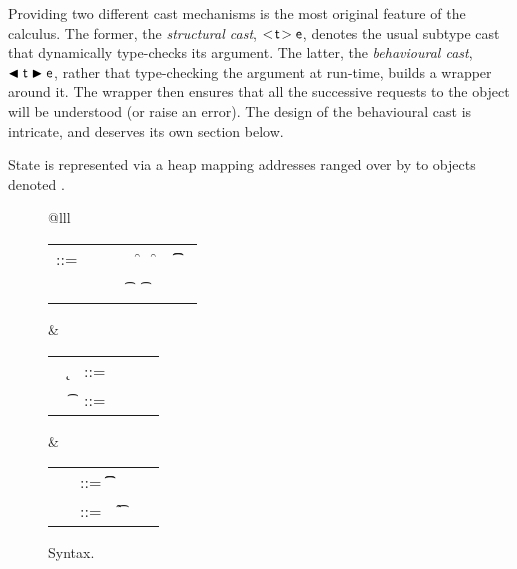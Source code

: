 \documentclass[acmlarge, anonymous, authordraft]{acmart}
\begin{document}
Providing two different cast mechanisms is the most original feature of the
calculus.  The former, the \emph{structural cast}, \(\SubCast\t\e\), denotes
the usual subtype cast that dynamically type-checks its argument.  The
latter, the \emph{behavioural cast}, \(\BehCast\t\e\), rather that
type-checking the argument at run-time, builds a wrapper around it.  The
wrapper then ensures that all the successive requests to the object will be
understood (or raise an error). The design of the behavioural cast is
intricate, and deserves its own section below.

State is represented via a heap \s mapping addresses ranged over by \a
to objects denoted \hspace{-1mm}\obj\C{\b\a}.

\begin{figure}[!h]
\hrulefill

\vspace{4mm}

\small
\begin{tabular}{@{}lll}

\begin{minipage}{9cm}\begin{tabular}{@{}l@{~}l@{}l@{}l@{}l@{}l@{}l@{}l}
\e\hspace{.1cm} ::= & \hspace{.2cm} \x        
    &\B \this         
   &\B \that      
   &\B \FRead\f     
   &\B \FWrite\f\e   
   &\B \KCall\e\m\e\t\t \\
   & &
   &\B \SubCast\t\e 
   &\B \BehCast\t\e 
   &\B \New\C{\b\e}  
   &\B \DynCall\e\m\e 
\end{tabular}\end{minipage}&
\begin{minipage}{2.9cm}\begin{tabular}{l@{~}l@{}l@{}l}
   ~ \k &::= \Class \C {\b\fd}{\b\md} \\
~ \t&::= ~ \any  \B   \C  \\ 
\end{tabular}\end{minipage} &
\begin{minipage}{2.9cm}\begin{tabular}{l@{~}l@{}l@{}l}
\md &::= \Mdef\m\x\t\t\e \\
~\fd&::= ~ \Fdef\f\t \\ 
\end{tabular}\end{minipage}\end{tabular}

\vspace{4mm}

\noindent\hrulefill
\caption{\kafka Syntax.}\label{syn}
\end{figure}
\end{document}
